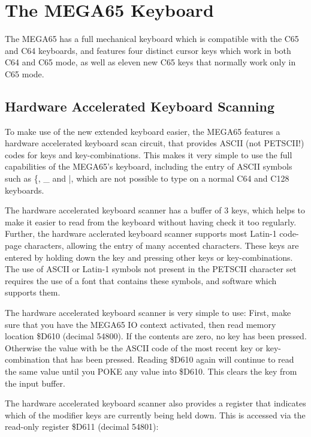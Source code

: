 
\chapter{The MEGA65 Keyboard}

The MEGA65 has a full mechanical keyboard which is compatible with the C65 and
C64 keyboards, and features four distinct cursor keys which work in both C64 and
C65 mode, as well as eleven new C65 keys that normally work only in C65 mode.

\section{Hardware Accelerated Keyboard Scanning}

To make use of the new extended keyboard easier, the MEGA65 features a hardware
accelerated keyboard scan circuit, that provides ASCII (not PETSCII!) codes for
keys and key-combinations.  This makes it very simple to use the full capabilities
of the MEGA65's keyboard, including the entry of ASCII symbols such as \{, \_ and |,
which are not possible to type on a normal C64 and C128 keyboards.

The hardware accelerated keyboard scanner has a buffer of 3 keys, which helps to
make it easier to read from the keyboard without having check it too regularly. 
Further, the hardware acclerated keyboard scanner supports most Latin-1 code-page
characters, allowing the entry of many accented characters.  These keys are
entered by holding down the \megasymbolkey key and pressing other keys or key-combinations.
The use of ASCII or Latin-1 symbols not present in the PETSCII character set
requires the use  of a font that contains these symbols, and software which supports them.

The hardware accelerated keyboard scanner is very simple to use: First, make sure
that you have the MEGA65 IO context activated, then read memory location \$D610
(decimal 54800). If the contents are zero, no key has been pressed.  Otherwise the
value with be the ASCII code of the most recent key or key-combination that has
been pressed.  Reading \$D610 again will continue to read the same value until
you POKE any value into \$D610. This clears the key from the input buffer.

The hardware accelerated keyboard scanner also provides a register that
indicates which of the modifier keys are currently being held down.  This is
accessed via the read-only register \$D611 (decimal 54801):

